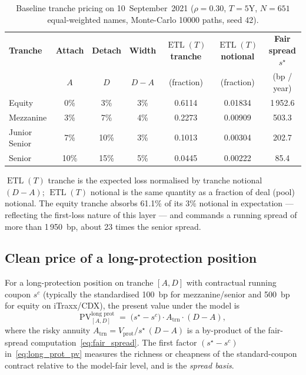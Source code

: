 \documentclass[11pt,a4paper]{article}
\newcommand{\1}{\mathbf{1}}
\DeclareMathOperator{\ETL}{ETL}
\begin{document}
\begin{table}[H]
\centering
\caption{Baseline tranche pricing on 10~September~2021
(\(\rho=0.30\), \(T=5\)Y, \(N=651\) equal-weighted names,
Monte-Carlo \num{10000} paths, seed 42).}
\label{tab:fair_spreads}
\setlength{\tabcolsep}{6pt}
\begin{tabular}{l c c c c c c}
\toprule
\textbf{Tranche} & \textbf{Attach} & \textbf{Detach} & \textbf{Width}
& \textbf{\(\ETL(T)\) tranche} & \textbf{\(\ETL(T)\) notional}
& \textbf{Fair spread \(s^{\star}\)}\\
 & $A$ & $D$ & $D-A$ & (fraction) & (fraction) & (bp / year)\\
\midrule
Equity        & 0\%  & 3\%  & 3\% & 0.6114 & 0.01834 & 1\,952.6\\
Mezzanine     & 3\%  & 7\%  & 4\% & 0.2273 & 0.00909 & 503.3\\
Junior Senior & 7\%  & 10\% & 3\% & 0.1013 & 0.00304 & 202.7\\
Senior        & 10\% & 15\% & 5\% & 0.0445 & 0.00222 & 85.4\\
\bottomrule
\end{tabular}

\medskip
\begin{minipage}{0.95\textwidth}
\footnotesize \(\ETL(T)\) tranche is the expected loss normalised by
tranche notional \((D-A)\); \(\ETL(T)\) notional is the same quantity
as a fraction of deal (pool) notional. The equity tranche absorbs
61.1\% of its \(3\%\) notional in expectation --- reflecting the
first-loss nature of this layer --- and commands a running spread of
more than 1\,950~bp, about 23 times the senior spread.
\end{minipage}
\end{table}

\subsection{Clean price of a long-protection position}
For a long-protection position on tranche \([A,D]\) with contractual
running coupon \(s^{c}\) (typically the standardised 100~bp for
mezzanine/senior and 500~bp for equity on iTraxx/CDX), the present
value under the model is
\begin{equation}
\mathrm{PV}^{\text{long prot}}_{[A,D]}
\;=\; \bigl(s^{\star}-s^{c}\bigr)\cdot A_{\mathrm{trn}}\cdot(D-A),
\label{eq:long_prot_pv}
\end{equation}
where the risky annuity
\(A_{\mathrm{trn}}=V_{\text{prot}}/s^{\star}\,(D-A)\) is a by-product
of the fair-spread computation~\eqref{eq:fair_spread}. The first
factor \((s^{\star}-s^{c})\) in~\eqref{eq:long_prot_pv} measures the
richness or cheapness of the standard-coupon contract relative to
the model-fair level, and is the \emph{spread basis}.
\end{document}
